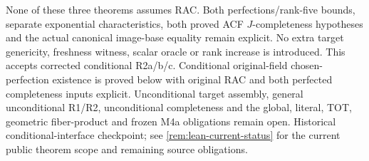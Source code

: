 \documentclass[11pt,oneside]{article}
\theoremstyle{definition}
\theoremstyle{remark}
\begin{document}
None of these three theorems assumes RAC. Both perfections/rank-five bounds,
separate exponential characteristics, both proved ACF $J$-completeness
hypotheses and the actual canonical image-base equality remain explicit.
No extra target genericity, freshness witness, scalar oracle or rank increase
is introduced. This accepts corrected conditional R2a/b/c. Conditional
original-field chosen-perfection existence is proved below with original RAC
and both perfected completeness inputs explicit. Unconditional target assembly,
general unconditional R1/R2, unconditional completeness and the global,
literal, TOT, geometric fiber-product and frozen M4a obligations remain open.
Historical conditional-interface checkpoint; see \cref{rem:lean-current-status} for
the current public theorem scope and remaining source obligations.
\end{document}
